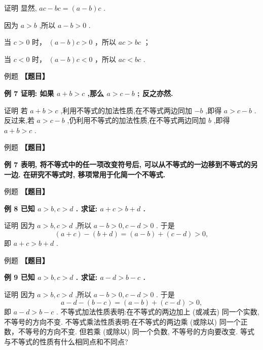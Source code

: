 \documentclass[a4paper,10pt,oneside,fontset=none]{ctexbook}
\newcounter{example}[chapter]
\newenvironment{example}[1][]{\begin{exBox}{例题}{#1}}{\end{exBox}}
\numberwithin{equation}{chapter}
\begin{document}
证明 显然, ${ac} - {bc} = \left( {a - b}\right) c$ .

因为 $a > b$ ,所以 $a - b > 0$ .

当 $c > 0$ 时， $\left( {a - b}\right) c > 0$ ，所以 ${ac} > {bc}$ ；

当 $c < 0$ 时， $\left( {a - b}\right) c < 0$ ，所以 ${ac} < {bc}$ .

\begin{example}
\textbf{【题目】}\par\vspace{0.3em}
\textbf{例 7 证明: 如果 $a + b > c$ ,那么 $a > c - b$ ; 反之亦然.}\par\vspace{0.3em}
证明 若 $a + b > c$ ,利用不等式的加法性质,在不等式两边同加 $- b$ ,即得 $a > c - b$ .
反过来,若 $a > c - b$ ,仍利用不等式的加法性质,在不等式两边同加 $b$ ,即得 $a + b > c$ .
\end{example}

\begin{example}
\textbf{【题目】}\par\vspace{0.3em}
\textbf{例 7 表明, 将不等式中的任一项改变符号后, 可以从不等式的一边移到不等式的另一边. 在研究不等式时, 移项常用于化简一个不等式.}\par\vspace{0.3em}
\end{example}

\begin{example}
\textbf{【题目】}\par\vspace{0.3em}
\textbf{例 8 已知 $a > b, c > d$ . 求证: $a + c > b + d$ .}\par\vspace{0.3em}
证明 因为 $a > b, c > d$ ,所以 $a - b > 0, c - d > 0$ .
于是
$$
\left( {a + c}\right)  - \left( {b + d}\right)  = \left( {a - b}\right)  + \left( {c - d}\right)  > 0,
$$
即 $a + c > b + d$ .
\end{example}

\begin{example}
\textbf{【题目】}\par\vspace{0.3em}
\textbf{例 9 已知 $a > b, c > d$ . 求证: $a - d > b - c$ .}\par\vspace{0.3em}
证明 因为 $a > b, c > d$ ,所以 $a - b > 0, c - d > 0$ .
于是
$$
a - d - \left( {b - c}\right)  = \left( {a - b}\right)  + \left( {c - d}\right)  > 0,
$$
即 $a - d > b - c$ .
不等式加法性质表明:在不等式的两边加上 (或减去) 同一个实数, 不等号的方向不变.
不等式乘法性质表明:在不等式的两边乘 (或除以) 同一个正数，不等号的方向不变. 但若乘 (或除以) 同一个负数, 不等号的方向要改变.
等式与不等式的性质有什么相同点和不同点?
\end{example}
\end{document}
